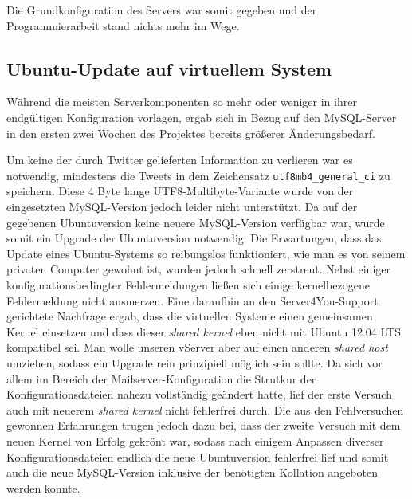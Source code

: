 
Die Grundkonfiguration des Servers war somit gegeben und der Programmierarbeit stand nichts mehr im Wege.


\subsection{Ubuntu-Update auf virtuellem System}
Während die meisten Serverkomponenten so mehr oder weniger in ihrer endgültigen Konfiguration vorlagen, ergab sich in Bezug auf den MySQL-Server in den ersten zwei Wochen des Projektes bereits größerer Änderungsbedarf.

Um keine der durch Twitter gelieferten Information zu verlieren war es notwendig, mindestens die Tweets in dem Zeichensatz \texttt{utf8mb4\_general\_ci} zu speichern. Diese 4 Byte lange UTF8-Multibyte-Variante wurde von der eingesetzten MySQL-Version jedoch leider nicht unterstützt.%
Da auf der gegebenen Ubuntuversion keine neuere MySQL-Version verfügbar war, wurde somit ein Upgrade der Ubuntuversion notwendig.
Die Erwartungen, dass das Update eines Ubuntu-Systems so reibungslos funktioniert, wie man es von seinem privaten Computer gewohnt ist, wurden jedoch schnell zerstreut.
Nebst einiger konfigurationsbedingter Fehlermeldungen ließen sich einige kernelbezogene Fehlermeldung nicht ausmerzen. Eine daraufhin an den Server4You-Support gerichtete Nachfrage ergab, dass die virtuellen Systeme einen gemeinsamen Kernel einsetzen und dass dieser \textit{shared kernel} eben nicht mit Ubuntu 12.04 LTS kompatibel sei. Man wolle unseren vServer aber auf einen anderen \textit{shared host} umziehen, sodass ein Upgrade rein prinzipiell möglich sein sollte.
Da sich vor allem im Bereich der Mailserver-Konfiguration die Strutkur der Konfigurationsdateien nahezu vollständig geändert hatte, lief der erste Versuch auch mit neuerem \textit{shared kernel} nicht fehlerfrei durch.
Die aus den Fehlversuchen gewonnen Erfahrungen trugen jedoch dazu bei, dass der zweite Versuch mit dem neuen Kernel von Erfolg gekrönt war, sodass nach einigem Anpassen diverser Konfigurationsdateien endlich die neue Ubuntuversion fehlerfrei lief und somit auch die neue MySQL-Version inklusive der benötigten Kollation angeboten werden konnte.

